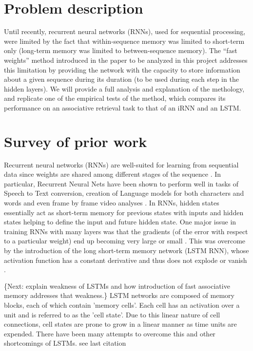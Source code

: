 \section{Problem description}

Until recently, recurrent neural networks (RNNs), used for sequential processing, were limited by the fact that within-sequence memory was limited to short-term only (long-term memory was limited to between-sequence memory). The ``fast weights'' method introduced in the paper to be analyzed in this project \cite{NIPS2016_6057} addresses this limitation by providing the network with the capacity to store information about a given sequence during its duration (to be used during each step in the hidden layers). We will provide a full analysis and explanation of the methology, and replicate one of the empirical tests of the method, which compares its performance on an associative retrieval task to that of an iRNN and an LSTM.

\section{Survey of prior work}

Recurrent neural networks (RNNs) are well-suited for learning from sequential data since weights are shared among different stages of the sequence \cite[p. 373]{Goodfellow-et-al-2016}. In particular, Recurrent Neural Nets have been shown to perform well in tasks of Speech to Text conversion, creation of Language models for both characters and words \cite{sutskever} and even frame by frame video analyses \cite{mnih}. In RNNs, hidden states essentially act as short-term memory for previous states with inputs and hidden states helping to define the input and future hidden state. One major issue in training RNNs with many layers was that the gradients (of the error with respect to a particular weight) end up becoming very large or small \cite[p. 16]{DBLP:journals/nn/Schmidhuber15}. This was overcome by the introduction of the long short-term memory network (LSTM RNN), whose activation function has a constant derivative and thus does not explode or vanish \cite[p. 19]{DBLP:journals/nn/Schmidhuber15}.

\{Next: explain weakness of LSTMs and how introduction of fast associative memory addresses that weakness.\}
LSTM networks are composed of memory blocks, each of which contain 'memory cells'. Each cell has an activation over a unit and is referred to as the 'cell state'. Due to this linear nature of cell connections, cell states are prone to grow in a linear manner as time units are expended. There have been many attempts to overcome this and other shortcomings of LSTMs. {see last citation}


